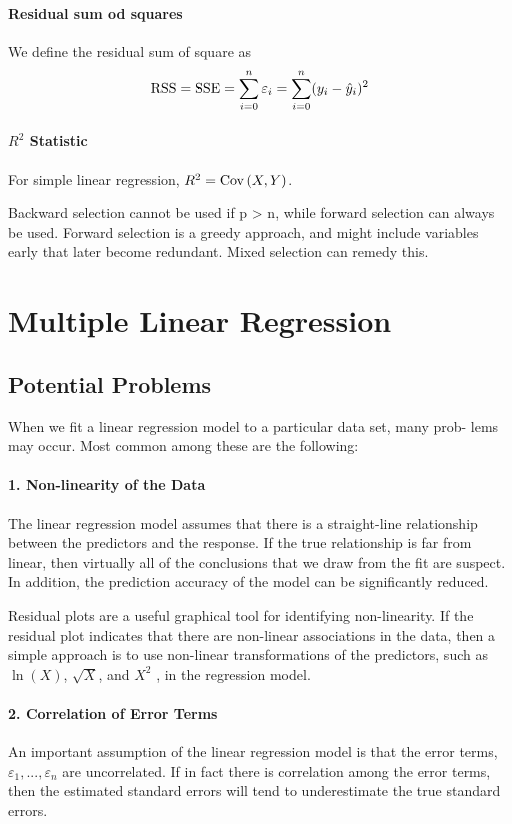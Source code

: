 \paragraph{Residual sum od squares}
We define the residual sum of square as
\[ \mathrm{RSS} = \mathrm{SSE} = \sum_{i=0}^n \varepsilon_i = \sum_{i=0}^n (y_i - \hat{y}_i)^2 \]

\paragraph{$R^2$ Statistic} 
For simple linear regression, $R^2 = \mathrm{Cov} \left( X, Y \right)$.

Backward selection cannot be used if p > n, while forward selection can
always be used. Forward selection is a greedy approach, and might include
variables early that later become redundant. Mixed selection can remedy
this.

\section{Multiple Linear Regression}

\subsection{Potential Problems}
When we fit a linear regression model to a particular data set, many prob-
lems may occur. Most common among these are the following:

\paragraph{1. Non-linearity of the Data}
The linear regression model assumes that there is a straight-line relationship between the predictors and the response. If the true relationship is far from linear, then virtually all of the conclusions that we draw from the fit are suspect. In addition, the prediction accuracy of the model can be significantly reduced.

Residual plots are a useful graphical tool for identifying non-linearity. If the residual plot indicates that there are non-linear associations in the data, then a simple approach is to use non-linear transformations of the predictors, such as $\ln(X)$, $\sqrt{X}$, and $X^2$ , in the regression model.

\paragraph{2. Correlation of Error Terms}
An important assumption of the linear regression model is that the error terms, $\varepsilon_1,...,\varepsilon_n$ are uncorrelated. If in fact there is correlation among the error terms, then the estimated standard errors will tend to underestimate the true standard errors.

